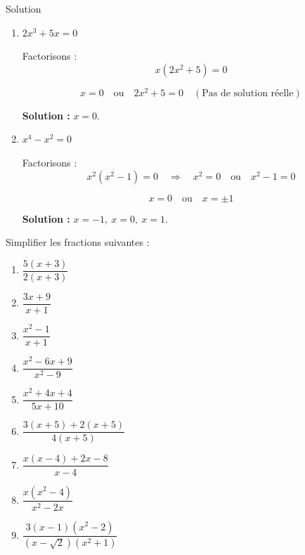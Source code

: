 \documentclass[a4paper,12pt]{article}
\begin{document}
\begin{solutionbox}{Solution}
\begin{enumerate}
    \[
    x = 0 \quad \text{ou} \quad x^2 + 3 = 0 \quad (\text{Pas de solution réelle})
    \]

    \textbf{Solution :} \( x = 0 \).

    \item \( 2x^3 + 5x = 0 \)

    Factorisons :
    \[
    x(2x^2 + 5) = 0
    \]

    \[
    x = 0 \quad \text{ou} \quad 2x^2 + 5 = 0 \quad (\text{Pas de solution réelle})
    \]

    \textbf{Solution :} \( x = 0 \).

    \item \( x^4 - x^2 = 0 \)

    Factorisons :
    \[
    x^2(x^2 - 1) = 0 \quad \Rightarrow \quad x^2 = 0 \quad \text{ou} \quad x^2 - 1 = 0
    \]

    \[
    x = 0 \quad \text{ou} \quad x = \pm 1
    \]

    \textbf{Solution :} \( x = -1,\ x = 0,\ x = 1 \).

\end{enumerate}
\end{solutionbox}

\begin{exercice}[title=Exercice 11]
Simplifier les fractions suivantes :

\begin{enumerate}
    \item \( \dfrac{5(x+3)}{2(x+3)} \)
    \item \( \dfrac{3x+9}{x+1} \)
    \item \( \dfrac{x^2 - 1}{x + 1} \)
    \item \( \dfrac{x^2 - 6x + 9}{x^2 - 9} \)
    \item \( \dfrac{x^2 + 4x + 4}{5x + 10} \)
    \item \( \dfrac{3(x+5) + 2(x+5)}{4(x+5)} \)
    \item \( \dfrac{x(x - 4) + 2x - 8}{x - 4} \)
    \item \( \dfrac{x(x^2 - 4)}{x^2 - 2x} \)
    \item \( \dfrac{3(x - 1)(x^2 - 2)}{(x - \sqrt{2})(x^2 + 1)} \)
\end{enumerate}
\end{exercice}
\end{document}
